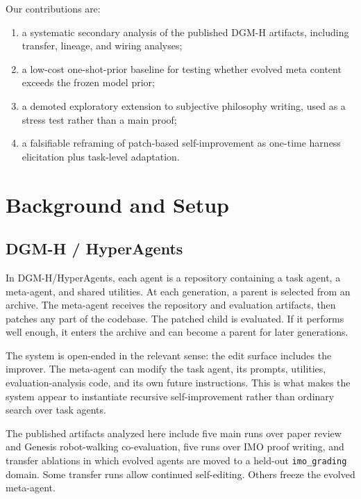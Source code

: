 \documentclass[11pt]{article}
\providecommand{\tightlist}{\setlength{\itemsep}{1pt}\setlength{\parskip}{0pt}}
\begin{document}
Our contributions are:

\begin{enumerate}
\def\labelenumi{\arabic{enumi}.}
\tightlist
\item
  a systematic secondary analysis of the published DGM-H artifacts, including transfer, lineage, and wiring analyses;
\item
  a low-cost one-shot-prior baseline for testing whether evolved meta content exceeds the frozen model prior;
\item
  a demoted exploratory extension to subjective philosophy writing, used as a stress test rather than a main proof;
\item
  a falsifiable reframing of patch-based self-improvement as one-time harness elicitation plus task-level adaptation.
\end{enumerate}

\section{Background and Setup}\label{background-and-setup}

\subsection{DGM-H / HyperAgents}\label{dgm-h-hyperagents}

In DGM-H/\allowbreak HyperAgents, each agent is a repository containing a task agent, a meta-agent, and shared utilities. At each generation, a parent is selected from an archive. The meta-agent receives the repository and evaluation artifacts, then patches any part of the codebase. The patched child is evaluated. If it performs well enough, it enters the archive and can become a parent for later generations.

The system is open-ended in the relevant sense: the edit surface includes the improver. The meta-agent can modify the task agent, its prompts, utilities, evaluation-analysis code, and its own future instructions. This is what makes the system appear to instantiate recursive self-improvement rather than ordinary search over task agents.

The published artifacts analyzed here include five main runs over paper review and Genesis robot-walking co-evaluation, five runs over IMO proof writing, and transfer ablations in which evolved agents are moved to a held-out \texttt{imo\_grading} domain. Some transfer runs allow continued self-editing. Others freeze the evolved meta-agent.
\end{document}
